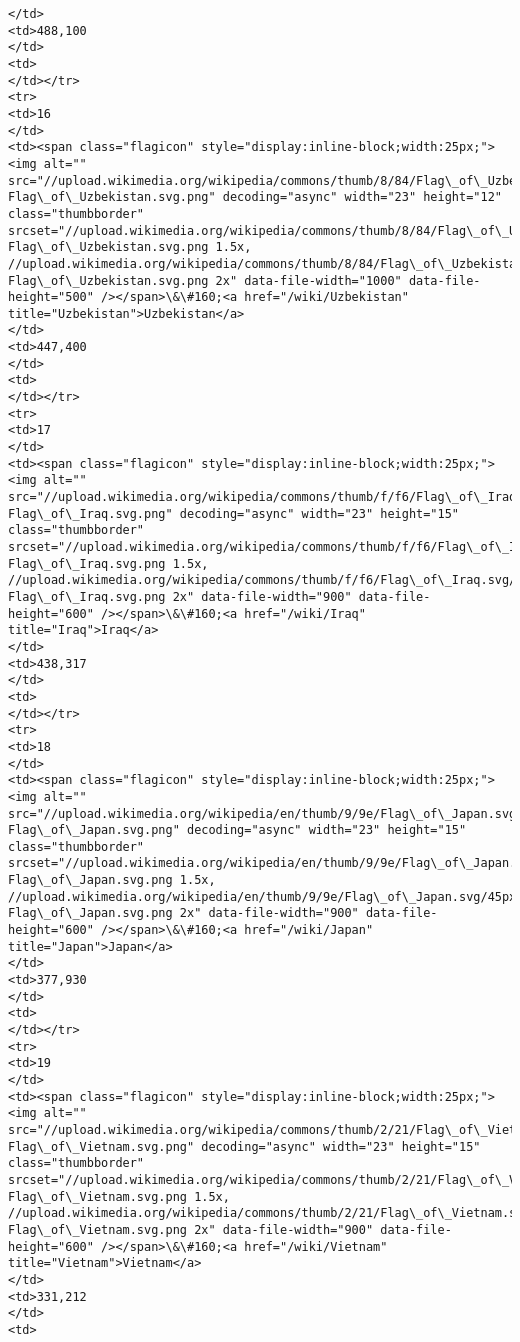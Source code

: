 \documentclass[11pt]{article}
\begin{document}
\begin{Verbatim}[commandchars=\\\{\}]
</td>
<td>488,100
</td>
<td>
</td></tr>
<tr>
<td>16
</td>
<td><span class="flagicon" style="display:inline-block;width:25px;"><img alt="" src="//upload.wikimedia.org/wikipedia/commons/thumb/8/84/Flag\_of\_Uzbekistan.svg/23px-Flag\_of\_Uzbekistan.svg.png" decoding="async" width="23" height="12" class="thumbborder" srcset="//upload.wikimedia.org/wikipedia/commons/thumb/8/84/Flag\_of\_Uzbekistan.svg/35px-Flag\_of\_Uzbekistan.svg.png 1.5x, //upload.wikimedia.org/wikipedia/commons/thumb/8/84/Flag\_of\_Uzbekistan.svg/46px-Flag\_of\_Uzbekistan.svg.png 2x" data-file-width="1000" data-file-height="500" /></span>\&\#160;<a href="/wiki/Uzbekistan" title="Uzbekistan">Uzbekistan</a>
</td>
<td>447,400
</td>
<td>
</td></tr>
<tr>
<td>17
</td>
<td><span class="flagicon" style="display:inline-block;width:25px;"><img alt="" src="//upload.wikimedia.org/wikipedia/commons/thumb/f/f6/Flag\_of\_Iraq.svg/23px-Flag\_of\_Iraq.svg.png" decoding="async" width="23" height="15" class="thumbborder" srcset="//upload.wikimedia.org/wikipedia/commons/thumb/f/f6/Flag\_of\_Iraq.svg/35px-Flag\_of\_Iraq.svg.png 1.5x, //upload.wikimedia.org/wikipedia/commons/thumb/f/f6/Flag\_of\_Iraq.svg/45px-Flag\_of\_Iraq.svg.png 2x" data-file-width="900" data-file-height="600" /></span>\&\#160;<a href="/wiki/Iraq" title="Iraq">Iraq</a>
</td>
<td>438,317
</td>
<td>
</td></tr>
<tr>
<td>18
</td>
<td><span class="flagicon" style="display:inline-block;width:25px;"><img alt="" src="//upload.wikimedia.org/wikipedia/en/thumb/9/9e/Flag\_of\_Japan.svg/23px-Flag\_of\_Japan.svg.png" decoding="async" width="23" height="15" class="thumbborder" srcset="//upload.wikimedia.org/wikipedia/en/thumb/9/9e/Flag\_of\_Japan.svg/35px-Flag\_of\_Japan.svg.png 1.5x, //upload.wikimedia.org/wikipedia/en/thumb/9/9e/Flag\_of\_Japan.svg/45px-Flag\_of\_Japan.svg.png 2x" data-file-width="900" data-file-height="600" /></span>\&\#160;<a href="/wiki/Japan" title="Japan">Japan</a>
</td>
<td>377,930
</td>
<td>
</td></tr>
<tr>
<td>19
</td>
<td><span class="flagicon" style="display:inline-block;width:25px;"><img alt="" src="//upload.wikimedia.org/wikipedia/commons/thumb/2/21/Flag\_of\_Vietnam.svg/23px-Flag\_of\_Vietnam.svg.png" decoding="async" width="23" height="15" class="thumbborder" srcset="//upload.wikimedia.org/wikipedia/commons/thumb/2/21/Flag\_of\_Vietnam.svg/35px-Flag\_of\_Vietnam.svg.png 1.5x, //upload.wikimedia.org/wikipedia/commons/thumb/2/21/Flag\_of\_Vietnam.svg/45px-Flag\_of\_Vietnam.svg.png 2x" data-file-width="900" data-file-height="600" /></span>\&\#160;<a href="/wiki/Vietnam" title="Vietnam">Vietnam</a>
</td>
<td>331,212
</td>
<td>

\end{Verbatim}
\end{document}
